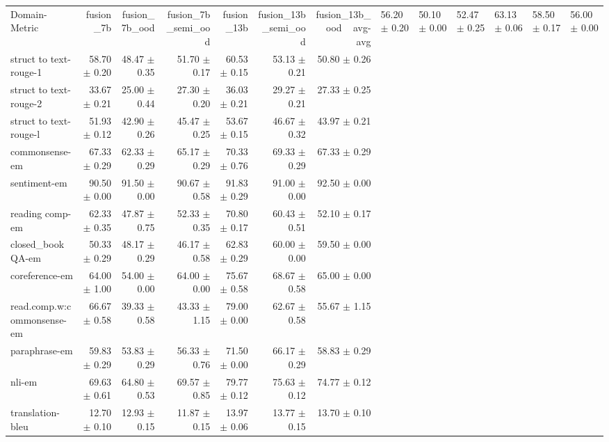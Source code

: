 \begin{tabular}{lrrrrrr}
\toprule
Domain-Metric & fusion\_7b & fusion\_7b\_ood & fusion\_7b\_semi\_ood & fusion\_13b & fusion\_13b\_semi\_ood & fusion\_13b\_ood \
\midrule
avg-avg & 56.20 $\pm$ 0.20 & 50.10 $\pm$ 0.00 & 52.47 $\pm$ 0.25 & 63.13 $\pm$ 0.06 & 58.50 $\pm$ 0.17 & 56.00 $\pm$ 0.00 \\
struct to text-rouge-1 & 58.70 $\pm$ 0.20 & 48.47 $\pm$ 0.35 & 51.70 $\pm$ 0.17 & 60.53 $\pm$ 0.15 & 53.13 $\pm$ 0.21 & 50.80 $\pm$ 0.26 \\
struct to text-rouge-2 & 33.67 $\pm$ 0.21 & 25.00 $\pm$ 0.44 & 27.30 $\pm$ 0.20 & 36.03 $\pm$ 0.21 & 29.27 $\pm$ 0.21 & 27.33 $\pm$ 0.25 \\
struct to text-rouge-l & 51.93 $\pm$ 0.12 & 42.90 $\pm$ 0.26 & 45.47 $\pm$ 0.25 & 53.67 $\pm$ 0.15 & 46.67 $\pm$ 0.32 & 43.97 $\pm$ 0.21 \\
commonsense-em & 67.33 $\pm$ 0.29 & 62.33 $\pm$ 0.29 & 65.17 $\pm$ 0.29 & 70.33 $\pm$ 0.76 & 69.33 $\pm$ 0.29 & 67.33 $\pm$ 0.29 \\
sentiment-em & 90.50 $\pm$ 0.00 & 91.50 $\pm$ 0.00 & 90.67 $\pm$ 0.58 & 91.83 $\pm$ 0.29 & 91.00 $\pm$ 0.00 & 92.50 $\pm$ 0.00 \\
reading comp-em & 62.33 $\pm$ 0.35 & 47.87 $\pm$ 0.75 & 52.33 $\pm$ 0.35 & 70.80 $\pm$ 0.17 & 60.43 $\pm$ 0.51 & 52.10 $\pm$ 0.17 \\
closed_book QA-em & 50.33 $\pm$ 0.29 & 48.17 $\pm$ 0.29 & 46.17 $\pm$ 0.58 & 62.83 $\pm$ 0.29 & 60.00 $\pm$ 0.00 & 59.50 $\pm$ 0.00 \\
coreference-em & 64.00 $\pm$ 1.00 & 54.00 $\pm$ 0.00 & 64.00 $\pm$ 0.00 & 75.67 $\pm$ 0.58 & 68.67 $\pm$ 0.58 & 65.00 $\pm$ 0.00 \\
read.comp.w:commonsense-em & 66.67 $\pm$ 0.58 & 39.33 $\pm$ 0.58 & 43.33 $\pm$ 1.15 & 79.00 $\pm$ 0.00 & 62.67 $\pm$ 0.58 & 55.67 $\pm$ 1.15 \\
paraphrase-em & 59.83 $\pm$ 0.29 & 53.83 $\pm$ 0.29 & 56.33 $\pm$ 0.76 & 71.50 $\pm$ 0.00 & 66.17 $\pm$ 0.29 & 58.83 $\pm$ 0.29 \\
nli-em & 69.63 $\pm$ 0.61 & 64.80 $\pm$ 0.53 & 69.57 $\pm$ 0.85 & 79.77 $\pm$ 0.12 & 75.63 $\pm$ 0.12 & 74.77 $\pm$ 0.12 \\
translation-bleu & 12.70 $\pm$ 0.10 & 12.93 $\pm$ 0.15 & 11.87 $\pm$ 0.15 & 13.97 $\pm$ 0.06 & 13.77 $\pm$ 0.15 & 13.70 $\pm$ 0.10 \\
\bottomrule
\end{tabular}
